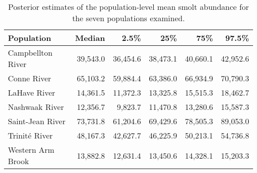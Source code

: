 \begin{table}[ht]
\centering
\caption{Posterior estimates of the population-level 
                    mean smolt abundance for the seven populations examined.} 
\begin{tabular}{lrrrrr}
  \hline
Population & Median & 2.5\% & 25\% & 75\% & 97.5\% \\ 
  \hline
Campbellton River & 39,543.0 & 36,454.6 & 38,473.1 & 40,660.1 & 42,952.6 \\ 
  Conne River & 65,103.2 & 59,884.4 & 63,386.0 & 66,934.9 & 70,790.3 \\ 
  LaHave River & 14,361.5 & 11,372.3 & 13,325.8 & 15,515.3 & 18,462.7 \\ 
  Nashwaak River & 12,356.7 & 9,823.7 & 11,470.8 & 13,280.6 & 15,587.3 \\ 
  Saint-Jean River & 73,731.8 & 61,204.6 & 69,429.6 & 78,505.3 & 89,053.0 \\ 
  Trinité River & 48,167.3 & 42,627.7 & 46,225.9 & 50,213.1 & 54,736.8 \\ 
  Western Arm Brook & 13,882.8 & 12,631.4 & 13,450.6 & 14,328.1 & 15,203.3 \\ 
   \hline
\end{tabular}
\end{table}
